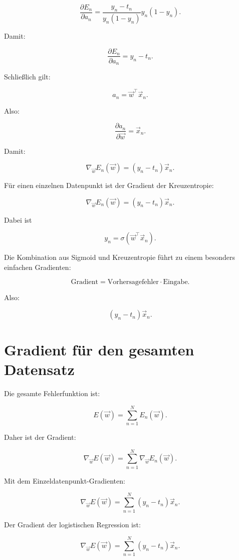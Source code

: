 \[
    \frac{\partial E_n}{\partial a_n}
    =
    \frac{y_n-t_n}{y_n(1-y_n)}
    y_n(1-y_n).
\]

Damit:

\[
    \frac{\partial E_n}{\partial a_n}
    =
    y_n-t_n.
\]

Schließlich gilt:

\[
    a_n
    =
    \vec{w}^{\top}\vec{x}_n.
\]

Also:

\[
    \frac{\partial a_n}{\partial \vec{w}}
    =
    \vec{x}_n.
\]

Damit:

\[
    \nabla_{\vec{w}}E_n(\vec{w})
    =
    (y_n-t_n)\vec{x}_n.
\]

\begin{definitionbox}
Für einen einzelnen Datenpunkt ist der Gradient der Kreuzentropie:

\[
    \nabla_{\vec{w}}E_n(\vec{w})
    =
    (y_n-t_n)\vec{x}_n.
\]

Dabei ist

\[
    y_n
    =
    \sigma(\vec{w}^{\top}\vec{x}_n).
\]
\end{definitionbox}

\begin{conceptbox}
Die Kombination aus Sigmoid und Kreuzentropie führt zu einem besonders einfachen Gradienten:

\[
    \text{Gradient}
    =
    \text{Vorhersagefehler}
    \cdot
    \text{Eingabe}.
\]

Also:

\[
    (y_n-t_n)\vec{x}_n.
\]
\end{conceptbox}

\section{Gradient für den gesamten Datensatz}

Die gesamte Fehlerfunktion ist:

\[
    E(\vec{w})
    =
    \sum_{n=1}^{N}
    E_n(\vec{w}).
\]

Daher ist der Gradient:

\[
    \nabla_{\vec{w}}E(\vec{w})
    =
    \sum_{n=1}^{N}
    \nabla_{\vec{w}}E_n(\vec{w}).
\]

Mit dem Einzeldatenpunkt-Gradienten:

\[
    \nabla_{\vec{w}}E(\vec{w})
    =
    \sum_{n=1}^{N}
    (y_n-t_n)\vec{x}_n.
\]

\begin{definitionbox}
Der Gradient der logistischen Regression ist:

\[
    \nabla_{\vec{w}}E(\vec{w})
    =
    \sum_{n=1}^{N}
    (y_n-t_n)\vec{x}_n.
\]
\end{definitionbox}

